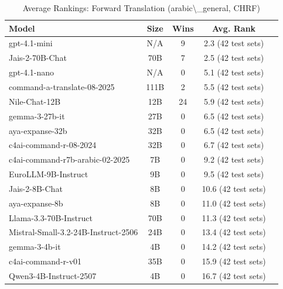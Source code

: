 \begin{table}[htbp]
\centering
\caption{Average Rankings: Forward Translation (arabic\textbackslash{}_general, CHRF)}
\label{tab:avg_rankings_chrf_arabic_general}
\begin{tabular}{l@{\hspace{3pt}}c@{\hspace{3pt}}c@{\hspace{3pt}}c@{\hspace{3pt}}c}
\toprule
Model & Size & Wins & Avg. Rank \\
\midrule
gpt-4.1-mini & N/A & 9 & 2.3 (42 test sets) \\
Jais-2-70B-Chat & 70B & 7 & 2.5 (42 test sets) \\
gpt-4.1-nano & N/A & 0 & 5.1 (42 test sets) \\
command-a-translate-08-2025 & 111B & 2 & 5.5 (42 test sets) \\
Nile-Chat-12B & 12B & 24 & 5.9 (42 test sets) \\
gemma-3-27b-it & 27B & 0 & 6.5 (42 test sets) \\
aya-expanse-32b & 32B & 0 & 6.5 (42 test sets) \\
c4ai-command-r-08-2024 & 32B & 0 & 6.7 (42 test sets) \\
c4ai-command-r7b-arabic-02-2025 & 7B & 0 & 9.2 (42 test sets) \\
EuroLLM-9B-Instruct & 9B & 0 & 9.5 (42 test sets) \\
Jais-2-8B-Chat & 8B & 0 & 10.6 (42 test sets) \\
aya-expanse-8b & 8B & 0 & 11.0 (42 test sets) \\
Llama-3.3-70B-Instruct & 70B & 0 & 11.3 (42 test sets) \\
Mistral-Small-3.2-24B-Instruct-2506 & 24B & 0 & 13.4 (42 test sets) \\
gemma-3-4b-it & 4B & 0 & 14.2 (42 test sets) \\
c4ai-command-r-v01 & 35B & 0 & 15.9 (42 test sets) \\
Qwen3-4B-Instruct-2507 & 4B & 0 & 16.7 (42 test sets) \\
\bottomrule
\end{tabular}
\end{table}